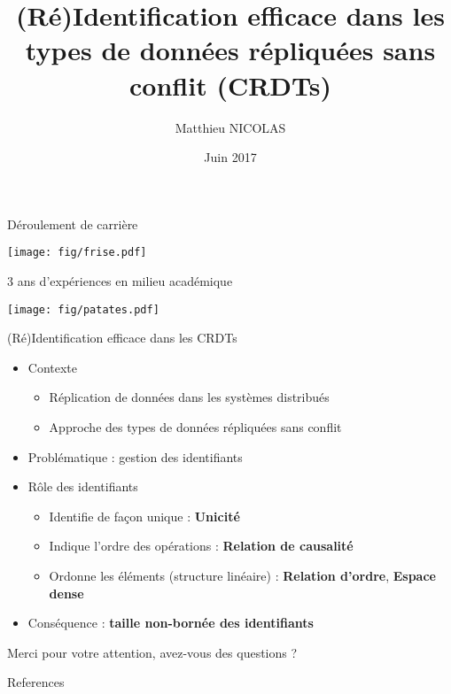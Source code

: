 \documentclass[10pt]{beamer}
\author{Matthieu NICOLAS}
\title{(Ré)Identification efficace dans les types de données répliquées sans conflit (CRDTs)}
\date{Juin 2017}
\begin{document}
\begin{frame}[t,plain]
\titlepage
\end{frame}

\begin{frame}{Déroulement de carrière}
  \begin{center}
    \texttt{[image: fig/frise.pdf]}
  \end{center}
\end{frame}

\begin{frame}{3 ans d'expériences en milieu académique}
  \begin{center}
    \texttt{[image: fig/patates.pdf]}
  \end{center}
\end{frame}


\begin{frame}{(Ré)Identification efficace dans les CRDTs}
  \begin{itemize}
    \item Contexte
    \begin{itemize}
      \item Réplication de données dans les systèmes distribués
      \item Approche des types de données répliquées sans conflit \cite{ShapiroSSS2011}
    \end{itemize}

    \item Problématique : gestion des identifiants

    \item Rôle des identifiants
    \begin{itemize}
      \item Identifie de façon unique : \textbf{Unicité}
      \item Indique l'ordre des opérations : \textbf{Relation de causalité}
      \item Ordonne les éléments (structure linéaire) : \textbf{Relation d'ordre}, \textbf{Espace dense}
    \end{itemize}

    \item Conséquence : \textbf{taille non-bornée des identifiants}
  \end{itemize}
\end{frame}

\begin{frame}[standout]
  Merci pour votre attention, avez-vous des questions ?
\end{frame}

\begin{frame}[allowframebreaks]{References}
	
	
\end{frame}
\end{document}
